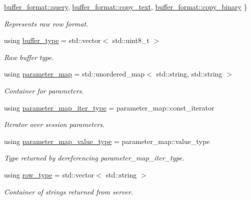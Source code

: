 \begin{DoxyCompactItemize}
\hyperlink{classsession_a960cb940bd12cd63c142c1ffae816b24a1b1cc7f086b3f074da452bc3129981eb}{buffer\+\_\+format\+::query}, 
\hyperlink{classsession_a960cb940bd12cd63c142c1ffae816b24a60768f0ec26ebf2efefb7d9195bdac46}{buffer\+\_\+format\+::copy\+\_\+text}, 
\hyperlink{classsession_a960cb940bd12cd63c142c1ffae816b24ace23a468f91f890c8e58ca0fecd9c78a}{buffer\+\_\+format\+::copy\+\_\+binary}
 \}\begin{DoxyCompactList}\small\item\em Represents raw row format. \end{DoxyCompactList}
\item 
using \hyperlink{classsession_a6d23252848c7fc9419e4bf318d57b43d}{buffer\+\_\+type} = std\+::vector$<$ std\+::uint8\+\_\+t $>$
\begin{DoxyCompactList}\small\item\em Raw buffer type. \end{DoxyCompactList}\item 
using \hyperlink{classsession_af41613cd234dabc0d89257e1444ea0a9}{parameter\+\_\+map} = std\+::unordered\+\_\+map$<$ std\+::string, std\+::string $>$
\begin{DoxyCompactList}\small\item\em Container for parameters. \end{DoxyCompactList}\item 
using \hyperlink{classsession_a1e824e1c18e52914acbf25408989622f}{parameter\+\_\+map\+\_\+iter\+\_\+type} = parameter\+\_\+map\+::const\+\_\+iterator
\begin{DoxyCompactList}\small\item\em Iterator over session parameters. \end{DoxyCompactList}\item 
using \hyperlink{classsession_aedf4b50ee29f6febfcc14df2d360ef98}{parameter\+\_\+map\+\_\+value\+\_\+type} = parameter\+\_\+map\+::value\+\_\+type
\begin{DoxyCompactList}\small\item\em Type returned by dereferencing parameter\+\_\+map\+\_\+iter\+\_\+type. \end{DoxyCompactList}\item 
using \hyperlink{classsession_ae75ba42ea21ef0fabffb963ca7e36380}{row\+\_\+type} = std\+::vector$<$ std\+::string $>$
\begin{DoxyCompactList}\small\item\em Container of strings returned from server. \end{DoxyCompactList}\item 

\end{DoxyCompactItemize}
